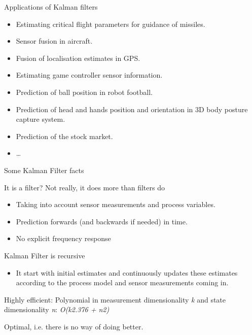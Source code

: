 \documentclass[compress]{beamer}
\providecommand{\tightlist}{%
  \setlength{\itemsep}{0pt}\setlength{\parskip}{0pt}}
\begin{document}
\begin{frame}{Applications of Kalman filters}

\begin{itemize}
\tightlist
\item
  Estimating critical flight parameters for guidance of missiles.
\item
  Sensor fusion in aircraft.
\item
  Fusion of localisation estimates in GPS.
\item
  Estimating game controller sensor information.
\item
  Prediction of ball position in robot football.
\item
  Prediction of head and hands position and orientation in 3D body
  posture capture system.
\item
  Prediction of the stock market.
\item
  \ldots{}
\end{itemize}

\end{frame}

\begin{frame}{Some Kalman Filter facts}

It is a filter? Not really, it does more than filters do

\begin{itemize}
\tightlist
\item
  Taking into account sensor measurements and process variables.
\item
  Prediction forwards (and backwards if needed) in time.
\item
  No explicit frequency response
\end{itemize}

Kalman Filter is recursive

\begin{itemize}
\tightlist
\item
  It start with initial estimates and continuously updates these
  estimates according to the process model and sensor measurements
  coming in.
\end{itemize}

Highly efficient: Polynomial in measurement dimensionality \emph{k} and
state dimensionality \emph{n}: \emph{O(k2.376 + n2)}

Optimal, i.e. there is no way of doing better.

\end{frame}
\end{document}
